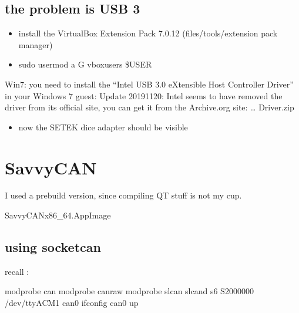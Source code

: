 \documentclass[letterpaper,10pt,english]{sphinxmanual}
\begin{document}
\sphinxAtStartPar
{}


\subsection{the problem is USB 3}
\label{\detokenize{linux/vbox:the-problem-is-usb-3}}\begin{itemize}
\item {} 
\sphinxAtStartPar
install the VirtualBox Extension Pack 7.0.12 (files/tools/extension pack manager)

\item {} 
\sphinxAtStartPar
sudo usermod \sphinxhyphen{}a \sphinxhyphen{}G vboxusers \$USER

\end{itemize}

\sphinxAtStartPar
\sphinxhyphen{}Win7: you need to install the “Intel USB 3.0 eXtensible Host Controller Driver” in your Windows 7 guest:
Update 2019\sphinxhyphen{}11\sphinxhyphen{}20: Intel seems to have removed the driver from its official site, you can get it from the Archive.org site:  … Driver.zip
\begin{itemize}
\item {} 
\sphinxAtStartPar
now the SETEK dice adapter should be visible

\end{itemize}


\section{SavvyCAN}
\label{\detokenize{linux/savvyCAN:savvycan}}\label{\detokenize{linux/savvyCAN::doc}}
\sphinxAtStartPar
{}

\sphinxAtStartPar
I used a prebuild version, since compiling QT stuff is not my cup.

\sphinxAtStartPar
SavvyCAN\sphinxhyphen{}x86\_64.AppImage


\subsection{using socketcan}
\label{\detokenize{linux/savvyCAN:using-socketcan}}
\sphinxAtStartPar
recall :

\begin{sphinxVerbatim}[commandchars=\\\{\}]
modprobe can
modprobe can\PYGZhy{}raw
modprobe slcan
slcand \PYGZhy{}s6 \PYGZhy{}S2000000 /dev/ttyACM1 can0
ifconfig can0 up
\end{sphinxVerbatim}
\end{document}
